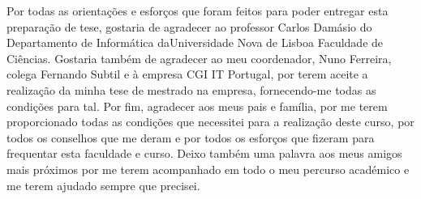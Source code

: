

\begin{ntacknowledgements}

Por todas as orientações e esforços que foram feitos para poder entregar esta preparação de tese, gostaria de agradecer ao professor Carlos Damásio do Departamento de Informática daUniversidade Nova de Lisboa Faculdade de Ciências. Gostaria também de agradecer ao meu coordenador, Nuno Ferreira, colega Fernando Subtil e à empresa CGI IT Portugal, por terem aceite a realização da minha tese de mestrado na empresa, fornecendo-me todas as condições para tal. Por fim, agradecer aos meus pais e família, por me terem proporcionado todas as condições que necessitei para a realização deste curso, por todos os conselhos que me deram e por todos os esforços que fizeram para frequentar esta faculdade e curso. Deixo também uma palavra aos meus amigos mais próximos por me terem acompanhado em todo o meu percurso académico e me terem ajudado sempre que precisei.

\end{ntacknowledgements}